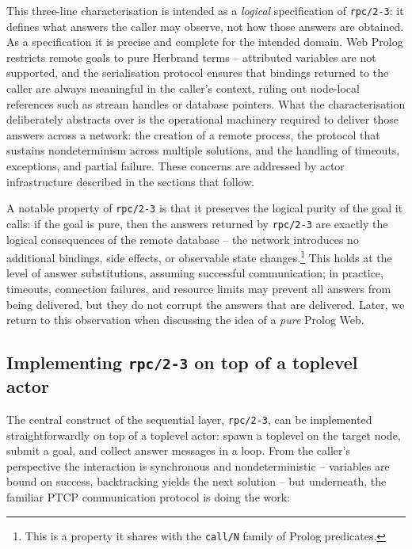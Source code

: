 This three-line characterisation is intended as a \emph{logical}
specification of \texttt{rpc/2-3}: it defines what answers the
caller may observe, not how those answers are obtained. As a specification it is precise and complete for the intended domain. Web Prolog restricts remote goals to pure Herbrand terms -- attributed variables are not supported, and the serialisation protocol ensures that bindings returned to the caller are always meaningful in the caller's context, ruling out node-local references such as stream handles or database pointers. What the characterisation deliberately abstracts over is the operational machinery required to deliver those answers across a network: the creation of a remote process, the protocol that sustains nondeterminism across multiple solutions, and the handling of timeouts, exceptions, and partial failure. These concerns are addressed by actor infrastructure described in the sections that follow.


\medskip
\noindent A notable property of \texttt{rpc/2-3} is that it preserves the
logical purity of the goal it calls: if the goal is pure, then the
answers returned by \texttt{rpc/2-3} are exactly the logical
consequences of the remote database -- the network introduces no
additional bindings, side effects, or observable state
changes.\footnote{This is a property it shares with the
\texttt{call/N} family of Prolog predicates.} This holds at the
level of answer substitutions, assuming successful communication; in
practice, timeouts, connection failures, and resource limits may
prevent all answers from being delivered, but they do not corrupt the
answers that are delivered. Later, we return to this observation when
discussing the idea of a \emph{pure} Prolog Web.

\subsection{Implementing \texttt{rpc/2-3} on top of a toplevel actor}\label{sec:rpc-on-top-of-toplevel}

The central construct of the sequential layer, \texttt{rpc/2-3}, can be
implemented straightforwardly on top of a toplevel actor: spawn a toplevel on
the target node, submit a goal, and collect answer messages in a loop. From the
caller's perspective the interaction is synchronous and nondeterministic --
variables are bound on success, backtracking yields the next solution -- but
underneath, the familiar PTCP communication protocol is doing the work:

